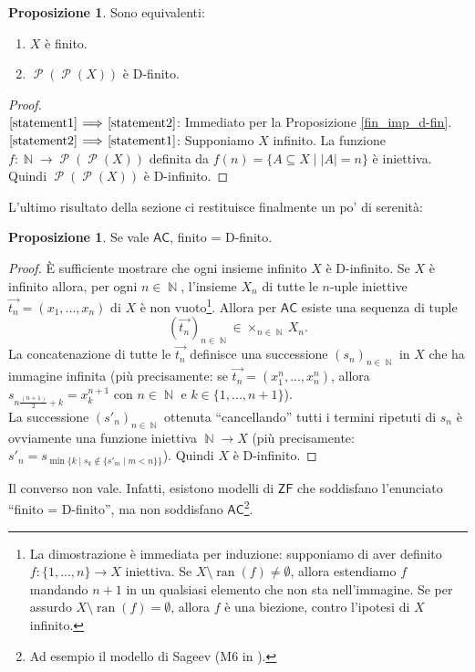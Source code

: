 \documentclass[12pt,a4paper]{report}
\theoremstyle{definition}
\newtheorem{prop}[teo]{Proposizione}  %
\theoremstyle{num.custom-title}
\DeclareMathOperator{\ran}{ran}
\DeclareMathOperator{\PP}{\mathcal{P}}
\DeclareMathOperator{\N}{\mathbb{N}}
\DeclareMathOperator{\sm}{\setminus}
\newcommand{\AC}{\ensuremath{\mathsf{AC}}\xspace}
\newcommand{\ZF}{\ensuremath{\mathsf{ZF}}\xspace}
\newcommand{\Implies}[2]{$\text{\ref{statement#1}}\!\implies\!\text{\ref{statement#2}}$}%
\newcommand{\punto}[1]{\item \label{statement#1}}
\newenvironment{equivalence}
    {\begin{enumerate}[label=(\arabic*),ref=(\arabic*)]
    }
    { 
	\end{enumerate}
    }
\begin{document}
\begin{prop}\label{prop_P(P(X))} Sono equivalenti:
\begin{equivalence}
\punto{1} $X$ è finito.
\punto{2} $\PP(\PP(X))$ è D-finito.
\end{equivalence}
\begin{proof}\ \\
\Implies{1}{2}: Immediato per la Proposizione \ref{fin_imp_d-fin}.\\
\Implies{2}{1}: Supponiamo $X$ infinito. La funzione $f: \N \to \PP(\PP(X))$ definita da $f(n)=\{A \subseteq X \mid |A|=n\}$ è iniettiva. Quindi $\PP(\PP(X))$ è D-infinito.
\end{proof}
\end{prop}

L'ultimo risultato della sezione ci restituisce finalmente un po' di serenità:

\begin{prop} 
Se vale \AC, finito = D-finito.
\begin{proof}
È sufficiente mostrare che ogni insieme infinito $X$ è D-infinito. Se $X$ è infinito allora, per ogni $n \in \N$, l'insieme $X_n$ di tutte le $n$-uple iniettive $\overrightarrow{t_n} = (x_1,...,x_n)$ di $X$ è non vuoto\footnote{La dimostrazione è immediata per induzione: supponiamo di aver definito $f: \{1,...,n\} \to X$ iniettiva. Se $X \sm \ran(f) \neq \emptyset$, allora estendiamo $f$ mandando $n+1$ in un qualsiasi elemento che non sta nell'immagine. Se per assurdo $X \sm \ran(f) = \emptyset$, allora $f$ è una biezione, contro l'ipotesi di $X$ infinito.}. Allora per \AC esiste una sequenza di tuple 
\[
\left(\overrightarrow{t_n}\right)_{n \in \N} \in \times_{n \in \N} X_n.
\]
La concatenazione di tutte le $\overrightarrow{t_n}$ definisce una successione $(s_n)_{n \in \N}$ in $X$ che ha immagine infinita (più precisamente: se $\overrightarrow{t_n}=(x_1^n,...,x_n^n)$, allora $s_{n \frac{(n+1)}{2}+k} = x_k^{n+1}$ con $n \in \N$ e $k \in \{1,...,n+1\}$).\\
La successione $(s'_n)_{n \in \N}$ ottenuta ``cancellando'' tutti i termini ripetuti di $s_n$ è ovviamente una funzione iniettiva $\N \to X$ (più precisamente: $s'_n = s_{\min\{k \mid s_k \not\in \{s'_m \mid m<n\}\}}$). Quindi $X$ è D-infinito.
\end{proof}
\end{prop}

Il converso non vale. Infatti, esistono modelli di \ZF che soddisfano l'enunciato ``finito = D-finito'', ma non soddisfano \AC\footnote{Ad esempio il modello di Sageev (M6 in \cite{HoRu98:Herrlich}).}.
\end{document}

